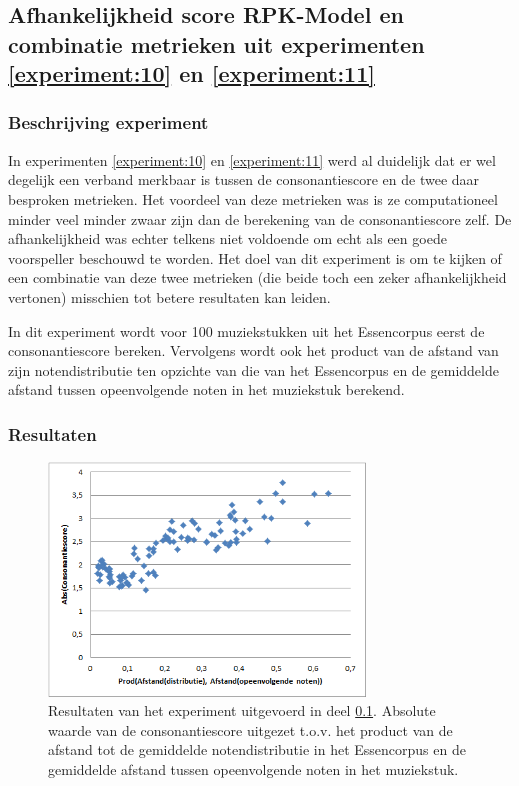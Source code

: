 \subsection{Afhankelijkheid score RPK-Model en combinatie metrieken uit experimenten \ref{experiment:10} en \ref{experiment:11}}
\label{experiment:12}
\subsubsection{Beschrijving experiment}
In experimenten \ref{experiment:10} en \ref{experiment:11} werd al duidelijk dat er wel degelijk een verband merkbaar is tussen de consonantiescore en de twee daar besproken metrieken. Het voordeel van deze metrieken was is ze computationeel minder veel minder zwaar zijn dan de berekening van de consonantiescore zelf. De afhankelijkheid was echter telkens niet voldoende om echt als een goede voorspeller beschouwd te worden. Het doel van dit experiment is om te kijken of een combinatie van deze twee metrieken (die beide toch een zeker afhankelijkheid vertonen) misschien tot betere resultaten kan leiden.

In dit experiment wordt voor 100 muziekstukken uit het Essencorpus eerst de consonantiescore bereken. Vervolgens wordt ook het product van de afstand van zijn notendistributie ten opzichte van die van het Essencorpus en de gemiddelde afstand tussen opeenvolgende noten in het muziekstuk berekend.

\subsubsection{Resultaten}
\begin{figure}[!ht]
  \centering
  \includegraphics[width=0.75\textwidth]{5_Experimenten_Resultaten/exp12_res}
  \caption{Resultaten van het experiment uitgevoerd in deel \ref{experiment:12}. Absolute waarde van de consonantiescore uitgezet t.o.v. het product van de afstand tot de gemiddelde notendistributie in het Essencorpus en de gemiddelde afstand tussen opeenvolgende noten in het muziekstuk.}
  \label{figuur:exp12}
\end{figure}

